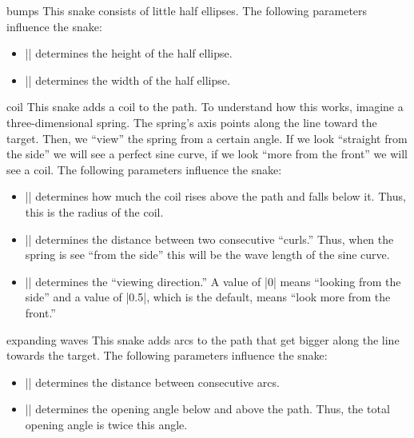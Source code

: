 \begin{snake}{bumps}
  This snake consists of little half ellipses. The following parameters
  influence the snake:
  \begin{itemize}
  \item |\pgfsnakesegmentamplitude|
    determines the height of the half ellipse.
  \item |\pgfsnakesegmentlength|
    determines the width of the half ellipse.
  \end{itemize}
\begin{codeexample}[]
\end{codeexample}
\end{snake}


\begin{snake}{coil}
  This snake adds a coil to the path. To understand how this works,
  imagine a three-dimensional spring. The spring's axis points along
  the line toward the target. Then, we ``view'' the spring from a
  certain angle. If we look ``straight from the side'' we will see a
  perfect sine curve, if we look ``more from the front'' we will see a
  coil. The following parameters influence the snake:  
  \begin{itemize}
  \item |\pgfsnakesegmentamplitude|
    determines how much the coil rises above the path and falls below
    it. Thus, this is the radius of the coil.
  \item |\pgfsnakesegmentlength|
    determines the distance between two consecutive ``curls.'' Thus,
    when the spring is see ``from the side'' this will be the wave
    length of the sine curve. 
  \item |\pgfsnakesegmentaspect|
    determines the ``viewing direction.'' A value of |0| means
    ``looking from the side'' and a value of |0.5|, which is the
    default, means ``look more from the front.'' 
  \end{itemize}
\begin{codeexample}[]
\end{codeexample}
\end{snake}


\begin{snake}{expanding waves}
  This snake adds arcs to the path that get bigger along the line
  towards the target. The following parameters influence the snake:
  \begin{itemize}
  \item |\pgfsnakesegmentlength|
    determines the distance between consecutive arcs.
  \item |\pgfsnakesegmentangle|
    determines the opening angle below and above the path. Thus, the
    total opening angle is twice this angle.
  \end{itemize}
\begin{codeexample}[]
\end{codeexample}
\end{snake}


